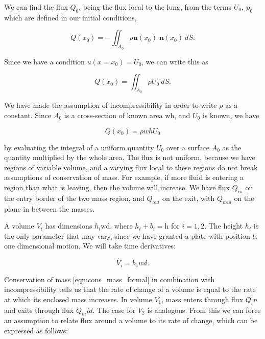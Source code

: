 \documentclass{article}
\begin{document}
We can find the flux $Q_0$, being the flux local to the lung, from the terms $U_0,~p_0$ which are defined in our initial conditions,

\begin{equation}
    Q(x_0) = -\iint_{A_0} \rho \bm{u}(x_0)\bm{\cdot n}(x_0)~dS.
\end{equation}

Since we have a condition $u(x=x_0) = U_0$, we can write this as

\begin{equation}
    Q(x_0) = \iint_{A_0} \rho U_0~dS.
\end{equation}

We have made the assumption of incompressibility in order to write $\rho$ as a constant.
Since $A_0$ is a cross-section of known area $\mathrm{wh}$, and $U_0$ is known, we have

\begin{equation}
    Q(x_0) = \rho wh U_0
    \label{eqn:twomass_lung_flux}
\end{equation}

by evaluating the integral of a uniform quantity $U_0$ over a surface $A_0$ as the quantity multiplied by the whole area.
The flux is not uniform, because we have regions of variable volume, and a varying flux local to these regions do not break assumptions of conservation of mass.
For example, if more fluid is entering a region than what is leaving, then the volume will increase.
We have flux $Q_{in}$ on the entry border of the two mass region, and $Q_{out}$ on the exit,
with $Q_{mid}$ on the plane in between the masses.

A volume $V_i$ has dimensions $h_i \mathrm{wd}$, where $h_i + b_i = \mathrm{h}$ for $i=1,2$.
The height $h_i$ is the only parameter that may vary, since we have granted a plate with position $b_i$ one dimensional motion.
We will take time derivatives:

\begin{equation}
    \dot{V_i} = \dot{h_i} w d.
\end{equation}

Conservation of mass \ref{eqn:cons_mass_formal} in combination with incompressibility tells us that the rate of change of a volume is equal to the rate at which its enclosed mass increases.
In volume $V_1$, mass enters through flux $Q_in$ and exits through flux $Q_mid$. The case for $V_2$ is analogous.
From this we can force an assumption to relate flux around a volume to its rate of change, which can be expressed as follows:
\end{document}
